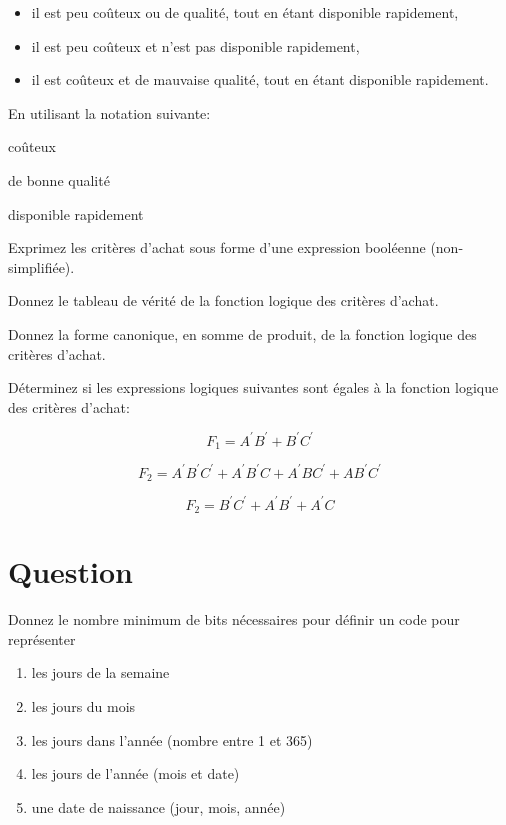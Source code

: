 \documentclass[letter, oneside]{book}
\begin{document}
\begin{itemize}
\item il est peu coûteux ou de qualité, tout en étant disponible
rapidement,

\item il est peu coûteux et n'est pas disponible rapidement,

\item il est coûteux et de mauvaise qualité, tout en étant disponible
rapidement.
\end{itemize}

En utilisant la notation suivante:

\begin{description}
\item[{A}] coûteux

\item[{B}] de bonne qualité

\item[{C}] disponible rapidement

\item Exprimez les critères d'achat sous forme d'une expression
booléenne (non-simplifiée).

\item Donnez le tableau de vérité de la fonction logique des critères
d'achat.

\item Donnez la forme canonique, en somme de produit, de la fonction
logique des critères d'achat.

\item Déterminez si les expressions logiques suivantes sont égales à la
fonction logique des critères d'achat:

$$F_1 = A^{\prime} B^{\prime} + B^{\prime} C^{\prime}$$

$$F_2 = A^{\prime} B^{\prime} C^{\prime} + A^{\prime} B^{\prime} C + A^{\prime} B C^{\prime} + A B^{\prime} C^{\prime}$$

$$F_2 = B^{\prime} C^{\prime} + A^{\prime} B^{\prime} + A^{\prime} C$$
\end{description}

\section*{Question}
\label{sec:org0c0b34b}
Donnez le nombre minimum de bits nécessaires pour définir un code pour représenter

\begin{enumerate}
\item les jours de la semaine

\item les jours du mois

\item les jours dans l'année (nombre entre 1 et 365)

\item les jours de l'année (mois et date)

\item une date de naissance (jour, mois, année)
\end{enumerate}
\end{document}
